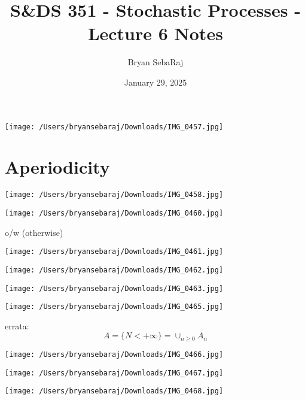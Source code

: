 \documentclass{article}
\title{S\&DS 351 - Stochastic Processes - Lecture 6 Notes}
\author{Bryan SebaRaj}
\date{January 29, 2025}
\begin{document}
\maketitle


\texttt{[image: /Users/bryansebaraj/Downloads/IMG\_0457.jpg]}

\section*{Aperiodicity}

\texttt{[image: /Users/bryansebaraj/Downloads/IMG\_0458.jpg]}


\texttt{[image: /Users/bryansebaraj/Downloads/IMG\_0460.jpg]}

o/w (otherwise)

\texttt{[image: /Users/bryansebaraj/Downloads/IMG\_0461.jpg]}


\texttt{[image: /Users/bryansebaraj/Downloads/IMG\_0462.jpg]}


\texttt{[image: /Users/bryansebaraj/Downloads/IMG\_0463.jpg]}

\texttt{[image: /Users/bryansebaraj/Downloads/IMG\_0465.jpg]}

errata: $$A=\{N < +\infty\}=\cup_{n\geq 0}A_n$$


\texttt{[image: /Users/bryansebaraj/Downloads/IMG\_0466.jpg]}

\texttt{[image: /Users/bryansebaraj/Downloads/IMG\_0467.jpg]}

\texttt{[image: /Users/bryansebaraj/Downloads/IMG\_0468.jpg]}
\end{document}
